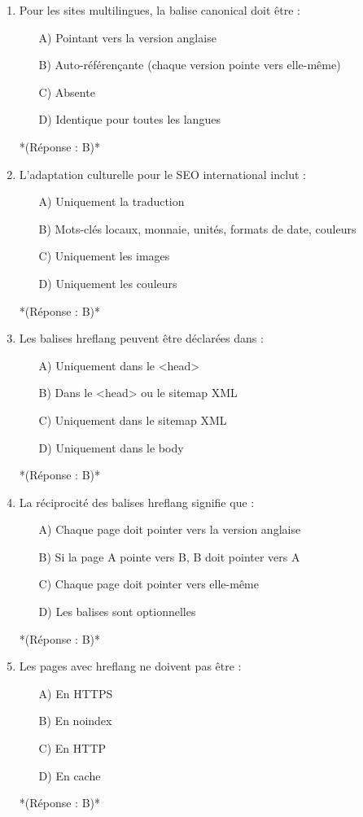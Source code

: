 \documentclass[12pt,a4paper,twoside]{report}
\begin{document}
\begin{enumerate}
\item Pour les sites multilingues, la balise canonical doit être :
\begin{itemize}
\item[A)] Pointant vers la version anglaise
\item[B)] Auto-référençante (chaque version pointe vers elle-même)
\item[C)] Absente
\item[D)] Identique pour toutes les langues
\end{itemize}
*(Réponse : B)*

\item L'adaptation culturelle pour le SEO international inclut :
\begin{itemize}
\item[A)] Uniquement la traduction
\item[B)] Mots-clés locaux, monnaie, unités, formats de date, couleurs
\item[C)] Uniquement les images
\item[D)] Uniquement les couleurs
\end{itemize}
*(Réponse : B)*

\item Les balises hreflang peuvent être déclarées dans :
\begin{itemize}
\item[A)] Uniquement dans le <head>
\item[B)] Dans le <head> ou le sitemap XML
\item[C)] Uniquement dans le sitemap XML
\item[D)] Uniquement dans le body
\end{itemize}
*(Réponse : B)*

\item La réciprocité des balises hreflang signifie que :
\begin{itemize}
\item[A)] Chaque page doit pointer vers la version anglaise
\item[B)] Si la page A pointe vers B, B doit pointer vers A
\item[C)] Chaque page doit pointer vers elle-même
\item[D)] Les balises sont optionnelles
\end{itemize}
*(Réponse : B)*

\item Les pages avec hreflang ne doivent pas être :
\begin{itemize}
\item[A)] En HTTPS
\item[B)] En noindex
\item[C)] En HTTP
\item[D)] En cache
\end{itemize}
*(Réponse : B)*


\end{enumerate}
\end{document}
